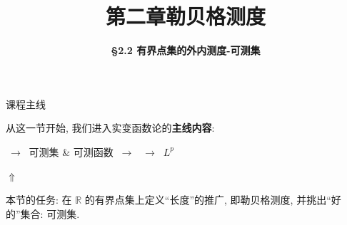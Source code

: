 \everymath{\displaystyle}



\title[第二章\\
勒贝格测度]{\texorpdfstring{\LARGE \bfseries 第二章\quad 勒贝格测度}{第二章 勒贝格测度}}
\author[\S 2.2\\
外内测度-可测集]
{\Large \bfseries \S 2.2 有界点集的外内测度-可测集}
\date{}





\begin{frame}

\titlepage

\end{frame}




\begin{frame}{课程主线}

从这一节开始, 我们进入实变函数论的\textbf{主线内容}:

\begin{center}
 $\ \longrightarrow\ $ \alert{可测集 \& 可测函数} $\ \longrightarrow\ $  $\ \longrightarrow\ $ $L^p$ 
\end{center}

\begin{center}
$\Uparrow$ 
\end{center}

\pause

本节的任务: 在 $\mathbb{R}$ 的有界点集上定义``长度''的推广, 即\alert{勒贝格测度}, 并挑出``好的''集合: \alert{可测集}.

\end{frame}



